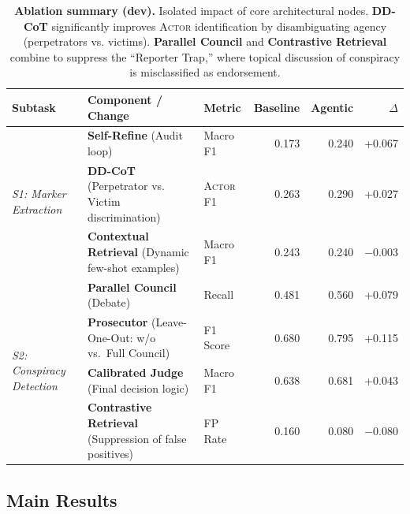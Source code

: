 \documentclass[11pt]{article}
\begin{document}
\begin{table}[t!]
	\centering
	\small
	\begin{tabular}{p{2.4cm}p{6.6cm}lrrr}
		\toprule
		\textbf{Subtask} & \textbf{Component / Change} & \textbf{Metric} & \textbf{Baseline} & \textbf{Agentic} & \textbf{$\Delta$} \\
		\midrule
		\multirow{3}{=}{\textit{S1: Marker Extraction}}
		 & \textbf{Self-Refine} (Audit loop)                              & Macro F1          & 0.173 & 0.240 & +0.067   \\
		 & \textbf{DD-CoT} (Perpetrator vs. Victim discrimination)        & \textsc{Actor} F1 & 0.263 & 0.290 & +0.027   \\
		 & \textbf{Contextual Retrieval} (Dynamic few-shot examples)      & Macro F1          & 0.243 & 0.240 & $-$0.003 \\
		\midrule
		\multirow{4}{=}{\textit{S2: Conspiracy Detection}}
		 & \textbf{Parallel Council} (Debate)                             & Recall   & 0.481 & 0.560 & +0.079   \\
		 & \textbf{Prosecutor} (Leave-One-Out: w/o vs.\ Full Council)     & F1 Score & 0.680 & 0.795 & +0.115   \\
		 & \textbf{Calibrated Judge} (Final decision logic)               & Macro F1 & 0.638 & 0.681 & +0.043   \\
		 & \textbf{Contrastive Retrieval} (Suppression of false positives)& FP Rate  & 0.160 & 0.080 & $-$0.080 \\
		\bottomrule
	\end{tabular}
	\caption{\textbf{Ablation summary (dev).} Isolated impact of core architectural nodes. \textbf{DD-CoT} significantly improves \textsc{Actor} identification by disambiguating agency (perpetrators vs. victims). \textbf{Parallel Council} and \textbf{Contrastive Retrieval} combine to suppress the ``Reporter Trap,'' where topical discussion of conspiracy is misclassified as endorsement.}
	\label{tab:combined_ablation}
\end{table}

\subsection{Main Results}
\label{sec:main_results}
\end{document}
